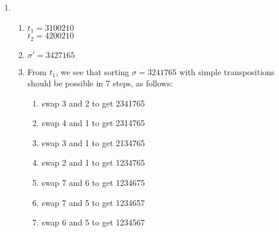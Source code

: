 \documentclass[a4paper,12pt]{article} %
\begin{document}
\begin{enumerate}
\item
	\begin{enumerate}
	\item $t_1 = 3100210$\\
		$t_2 = 4200210$
	\item $\sigma' = 3427165$
	\item From $t_1$, we see that sorting $\sigma = 3241765$ with simple transpositions should be possible in 7 steps, as follows:
		\begin{enumerate}
			\item swap 3 and 2 to get 2341765
			\item swap 4 and 1 to get 2314765
			\item swap 3 and 1 to get 2134765
			\item swap 2 and 1 to get 1234765
			\item swap 7 and 6 to get 1234675
			\item swap 7 and 5 to get 1234657
			\item swap 6 and 5 to get 1234567
		\end{enumerate}
	\end{enumerate}

\end{enumerate}
\end{document}
